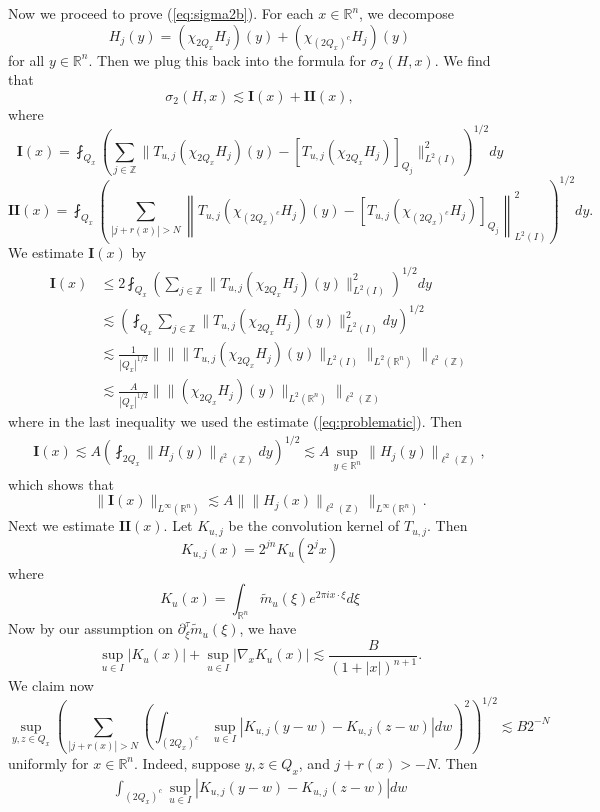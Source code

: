 \documentclass[12pt,leqno]{amsart}
\def\R{\mathbb{R}}
\def\Z{\mathbb{Z}}
\theoremstyle{plain}
\numberwithin{equation}{section}
\begin{document}
Now we proceed to prove (\ref{eq:sigma2b}). For each $x \in \R^n$, we decompose
\[
H_j(y) = (\chi_{2Q_x} H_j)(y) + (\chi_{(2Q_x)^c} H_j)(y) 
\]
for all $y \in \R^n$. Then we plug this back into the formula for $\sigma_2(H,x)$. We find that
\[
\sigma_2(H,x) \lesssim \mathbf{I}(x) + \mathbf{II}(x),
\]
where
\[
\mathbf{I}(x) = \fint_{Q_x} \left( \sum_{j \in \Z} \|T_{u,j} (\chi_{2Q_x} H_j)(y)- [T_{u,j} (\chi_{2Q_x} H_j)]_{Q_j}\|_{L^2(I)}^2 \right)^{1/2} dy
\]
\[
\mathbf{II}(x) = \fint_{Q_x} \left( \sum_{|j+r(x)| > N} \left\|T_{u,j} (\chi_{(2Q_x)^c} H_j)(y) - [T_{u,j} (\chi_{(2Q_x)^c} H_j)]_{Q_j} \right\|_{L^2(I)}^2 \right)^{1/2} dy.
\]
We estimate $\mathbf{I}(x)$ by
\begin{align*}
\mathbf{I}(x) 
&\leq 2 \fint_{Q_x} \left( \sum_{j \in \Z} \|T_{u,j} (\chi_{2Q_x} H_j)(y) \|_{L^2(I)}^2 \right)^{1/2} dy \\
& \lesssim  \left(  \fint_{Q_x} \sum_{j \in \Z} \|T_{u,j} (\chi_{2Q_x} H_j)(y) \|_{L^2(I)}^2  dy  \right)^{1/2} \\
& \lesssim \frac{1}{|Q_x|^{1/2}} \| \| \| T_{u,j} (\chi_{2Q_x} H_j)(y) \|_{L^2(I)} \|_{L^2(\R^n)} \|_{\ell^2(\Z)} \\
& \lesssim \frac{A}{|Q_x|^{1/2}} \| \| (\chi_{2Q_x} H_j)(y) \|_{L^2(\R^n)} \|_{\ell^2(\Z)}
\end{align*}
where in the last inequality we used the estimate (\ref{eq:problematic}). Then
\begin{align*}
\mathbf{I}(x) \lesssim 
A \left( \fint_{2Q_x} \| H_j(y) \|_{\ell^2(\Z)} dy \right)^{1/2} \lesssim A \sup_{y \in \R^n} \| H_j(y) \|_{\ell^2(\Z)},
\end{align*}
which shows that
\[
\|\mathbf{I}(x)\|_{L^{\infty}(\R^n)} \lesssim A \| \|H_j(x) \|_{\ell^2(\Z)} \|_{L^{\infty}(\R^n)}.
\]
Next we estimate $\mathbf{II}(x)$. Let $K_{u,j}$ be the convolution kernel of $T_{u,j}$. Then 
\[
K_{u,j}(x) = 2^{jn} K_{u}(2^j x)
\]
where
\[
K_u(x) = \int_{\R^n} \tilde{m}_u(\xi) e^{2\pi i x \cdot \xi} d\xi
\]
Now by our assumption on $\partial_{\xi}^{\tau} \tilde{m}_u(\xi)$, we have
\[
\sup_{u \in I} |K_u(x)| + \sup_{u \in I} |\nabla_x K_u(x)| \lesssim \frac{B}{(1+|x|)^{n+1}}.
\]
We claim now
\begin{equation} \label{eq:CZest}
\sup_{y, z \in Q_x} \left( \sum_{|j+r(x)| > N} \left( \int_{(2Q_x)^c} \sup_{u \in I} | K_{u,j}(y-w) - K_{u,j}(z-w) | dw \right)^2 \right)^{1/2} 
\lesssim B2^{-N}
\end{equation}
uniformly for $x \in \R^n$. Indeed, suppose $y, z \in Q_x$, and $j + r(x) > -N$. Then 
\begin{align*}
\int_{(2Q_x)^c} \sup_{u \in I} | K_{u,j}(y-w) - K_{u,j}(z-w) | dw
\end{align*}
\end{document}
